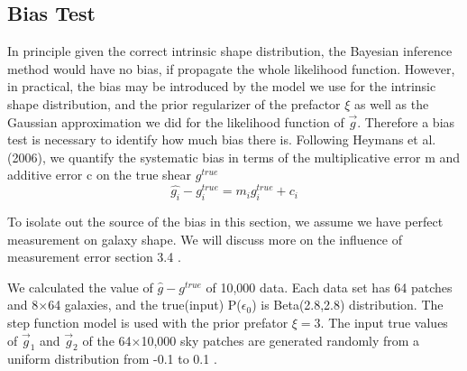 \documentclass[useAMS,usenatbib]{mn2e}
\begin{document}
\subsection{Bias Test}
In principle given the correct intrinsic shape distribution, the Bayesian inference method would have no bias, if propagate the whole likelihood function.
However, in practical, the bias may be introduced by the model we use for the intrinsic shape distribution,
and the prior regularizer of the prefactor $\xi$ as well as the Gaussian approximation we did for the likelihood
function of $\vec{g}$. Therefore a bias test is necessary to identify how much bias there is. 
Following Heymans et al. (2006), we quantify the systematic bias 
in terms of the multiplicative error m and additive error c on the
true shear $g^{true}$ 
\begin{equation}
\hat{g_{i}}-g_{i}^{true}=m_{i}g_{i}^{true}+c_{i}
\end{equation}

To isolate out the source of the bias in this section, we assume we have perfect measurement on galaxy shape.
We will discuss more on the influence of measurement error section 3.4 .

We calculated the value of $\hat{g}-g^{true}$ of 10,000 data. Each data set has 64 patches and 8$\times$64 galaxies, and
the true(input) P($\epsilon_{0}$) is Beta(2.8,2.8) distribution. The step function model is used with the prior prefator $\xi=3$.
The input true values of $\vec{g}_{1}$ and $\vec{g}_{2}$ of the 64$\times$10,000 sky patches are generated randomly from a uniform distribution from -0.1 to 0.1 . 
\end{document}
